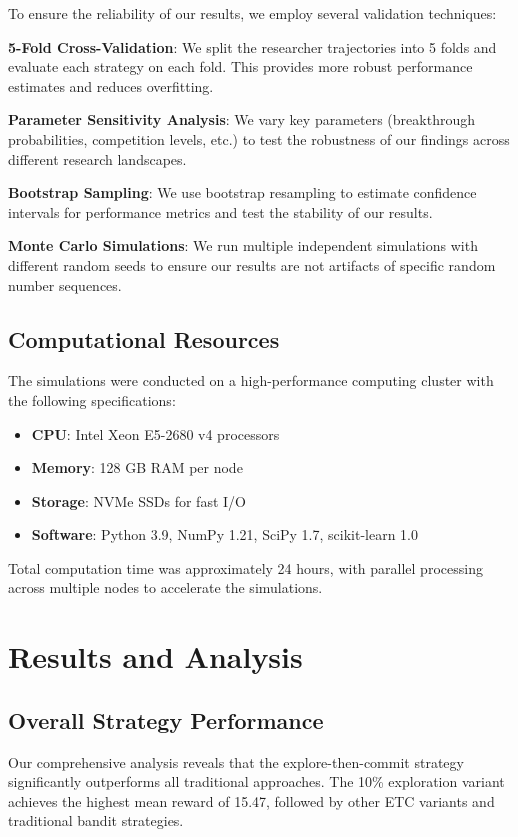 \documentclass[letterpaper]{article}
\begin{document}
To ensure the reliability of our results, we employ several validation techniques:

\textbf{5-Fold Cross-Validation}: We split the researcher trajectories into 5 folds and evaluate each strategy on each fold. This provides more robust performance estimates and reduces overfitting.

\textbf{Parameter Sensitivity Analysis}: We vary key parameters (breakthrough probabilities, competition levels, etc.) to test the robustness of our findings across different research landscapes.

\textbf{Bootstrap Sampling}: We use bootstrap resampling to estimate confidence intervals for performance metrics and test the stability of our results.

\textbf{Monte Carlo Simulations}: We run multiple independent simulations with different random seeds to ensure our results are not artifacts of specific random number sequences.

\subsection{Computational Resources}

The simulations were conducted on a high-performance computing cluster with the following specifications:
\begin{itemize}
\item \textbf{CPU}: Intel Xeon E5-2680 v4 processors
\item \textbf{Memory}: 128 GB RAM per node
\item \textbf{Storage}: NVMe SSDs for fast I/O
\item \textbf{Software}: Python 3.9, NumPy 1.21, SciPy 1.7, scikit-learn 1.0
\end{itemize}

Total computation time was approximately 24 hours, with parallel processing across multiple nodes to accelerate the simulations.

\section{Results and Analysis}

\subsection{Overall Strategy Performance}

Our comprehensive analysis reveals that the explore-then-commit strategy significantly outperforms all traditional approaches. The 10\% exploration variant achieves the highest mean reward of 15.47, followed by other ETC variants and traditional bandit strategies.
\end{document}
